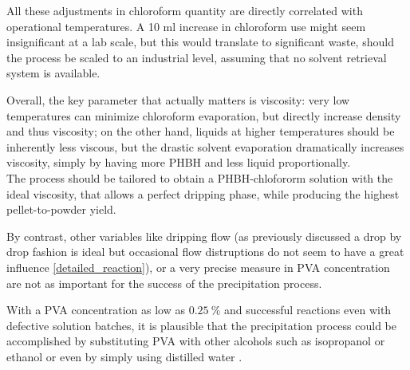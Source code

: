 \documentclass{article}
\begin{document}
        All these adjustments in chloroform quantity are directly correlated with operational temperatures. A 10 ml 
        increase in chloroform use might seem insignificant at a lab scale, but this would translate to significant waste, 
        should the process be scaled to an industrial level, assuming that no solvent retrieval system is available. 


        Overall, the key parameter that actually matters is viscosity: very low temperatures can minimize chloroform evaporation, 
        but directly increase density and thus viscosity; on the other hand, liquids at higher temperatures should be inherently 
        less viscous, but the drastic solvent evaporation dramatically increases viscosity, simply by having more PHBH and less 
        liquid proportionally. \\ 
        
        The process should be tailored to obtain a PHBH-chlofororm solution with the ideal viscosity, that allows a perfect dripping 
        phase, while producing the highest pellet-to-powder yield. 


        By contrast, other variables like dripping flow (as previously discussed a drop by drop fashion is ideal but occasional 
        flow distruptions do not seem to have a great influence \ref{detailed_reaction}), or a very precise measure in 
        PVA concentration are not as important for the success of the precipitation process. 

        With a PVA concentration as low as $0.25 \ \%$ and successful reactions even with defective
        solution batches, it is plausible that the precipitation process could be accomplished by 
        substituting PVA with other alcohols such as isopropanol or ethanol or even by simply using distilled water \footnotemark.
        
\end{document}
